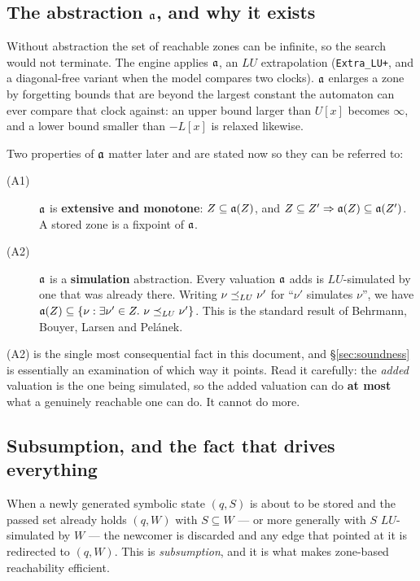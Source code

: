 \subsection{The abstraction $\mathfrak{a}$, and why it exists}

Without abstraction the set of reachable zones can be infinite, so the search would not terminate.
The engine applies $\mathfrak{a}$, an $LU$ extrapolation (\texttt{Extra\_LU+}, and a diagonal-free variant
when the model compares two clocks). $\mathfrak{a}$ enlarges a zone by forgetting bounds that are beyond
the largest constant the automaton can ever compare that clock against: an upper bound larger than
$U[x]$ becomes $\infty$, and a lower bound smaller than $-L[x]$ is relaxed likewise.

Two properties of $\mathfrak{a}$ matter later and are stated now so they can be referred to:

\begin{description}
  \item[(A1)] $\mathfrak{a}$ is \textbf{extensive and monotone}: $Z \subseteq \mathfrak{a}(Z)$, and
        $Z \subseteq Z' \Rightarrow \mathfrak{a}(Z) \subseteq \mathfrak{a}(Z')$. A stored zone is a
        fixpoint of $\mathfrak{a}$.
  \item[(A2)] $\mathfrak{a}$ is a \textbf{simulation} abstraction. Every valuation $\mathfrak{a}$ adds is
        $LU$-simulated by one that was already there. Writing $\nu \preceq_{LU} \nu'$ for
        ``$\nu'$ simulates $\nu$'', we have
        $\mathfrak{a}(Z) \subseteq \{\nu : \exists \nu' \in Z.\ \nu \preceq_{LU} \nu'\}$.
        This is the standard result of Behrmann, Bouyer, Larsen and Pel\'anek.
\end{description}

(A2) is the single most consequential fact in this document, and \S\ref{sec:soundness} is
essentially an examination of which way it points. Read it carefully: the \emph{added} valuation is
the one being simulated, so the added valuation can do \textbf{at most} what a genuinely reachable
one can do. It cannot do more.

\subsection{Subsumption, and the fact that drives everything}
\label{sec:setting:subsumption}

When a newly generated symbolic state $(q,S)$ is about to be stored and the passed set already
holds $(q,W)$ with $S \subseteq W$ --- or more generally with $S$ $LU$-simulated by $W$ --- the
newcomer is discarded and any edge that pointed at it is redirected to $(q,W)$. This is
\emph{subsumption}, and it is what makes zone-based reachability efficient.

